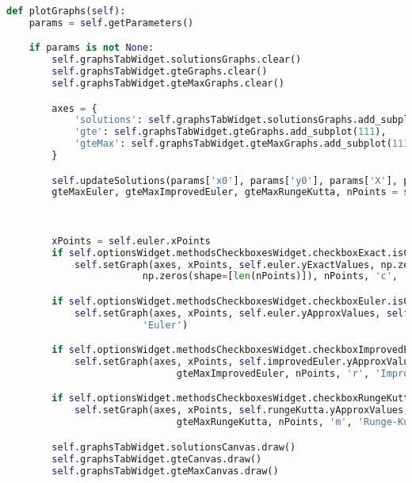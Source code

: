 \documentclass[12pt, a4paper]{article}
\begin{document}
    \newpage
    \begin{lstlisting}[language=Python, caption=plotGraphs method of ApplicationWindow class]
def plotGraphs(self):
    params = self.getParameters()

    if params is not None:
        self.graphsTabWidget.solutionsGraphs.clear()
        self.graphsTabWidget.gteGraphs.clear()
        self.graphsTabWidget.gteMaxGraphs.clear()

        axes = {
            'solutions': self.graphsTabWidget.solutionsGraphs.add_subplot(111),
            'gte': self.graphsTabWidget.gteGraphs.add_subplot(111),
            'gteMax': self.graphsTabWidget.gteMaxGraphs.add_subplot(111)
        }

        self.updateSolutions(params['x0'], params['y0'], params['X'], params['N'])
        gteMaxEuler, gteMaxImprovedEuler, gteMaxRungeKutta, nPoints = self.calculateGteMax(params['x0'], params['y0'],
                                                                                            params['X'], params['n0'],
                                                                                            params['nMax'])

        xPoints = self.euler.xPoints
        if self.optionsWidget.methodsCheckboxesWidget.checkboxExact.isChecked():
            self.setGraph(axes, xPoints, self.euler.yExactValues, np.zeros(shape=[len(self.euler.xPoints)]),
                        np.zeros(shape=[len(nPoints)]), nPoints, 'c', 'Exact')

        if self.optionsWidget.methodsCheckboxesWidget.checkboxEuler.isChecked():
            self.setGraph(axes, xPoints, self.euler.yApproxValues, self.euler.gte, gteMaxEuler, nPoints, 'b',
                        'Euler')

        if self.optionsWidget.methodsCheckboxesWidget.checkboxImprovedEuler.isChecked():
            self.setGraph(axes, xPoints, self.improvedEuler.yApproxValues, self.improvedEuler.gte,
                              gteMaxImprovedEuler, nPoints, 'r', 'Improved Euler')

        if self.optionsWidget.methodsCheckboxesWidget.checkboxRungeKutta.isChecked():
            self.setGraph(axes, xPoints, self.rungeKutta.yApproxValues, self.rungeKutta.gte,
                              gteMaxRungeKutta, nPoints, 'm', 'Runge-Kutta')

        self.graphsTabWidget.solutionsCanvas.draw()
        self.graphsTabWidget.gteCanvas.draw()
        self.graphsTabWidget.gteMaxCanvas.draw()
    \end{lstlisting}
    
\end{document}
